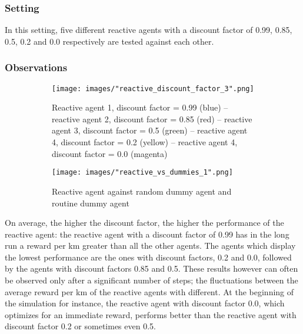 \documentclass[11pt]{article}
\begin{document}
\subsubsection{Setting}
In this setting, five different reactive agents with a discount factor of 0.99, 0.85, 0.5, 0.2 and 0.0 respectively are tested against each other.

\subsubsection{Observations}

\begin{figure}[h!]
\centering
\begin{subfigure}[t]{0.47\textwidth}
\captionsetup{width=1.0\textwidth}
\texttt{[image: images/"reactive\_discount\_factor\_3".png]}
\caption{Reactive agent 1, discount factor = 0.99 (blue) -- reactive agent 2, discount factor = 0.85 (red) -- reactive agent 3, discount factor = 0.5 (green) -- reactive agent 4, discount factor = 0.2 (yellow) -- reactive agent 4, discount factor = 0.0 (magenta)}
\end{subfigure}
\hfill
\begin{subfigure}[t]{0.47\textwidth}
\captionsetup{width=1.0\textwidth}
\texttt{[image: images/"reactive\_vs\_dummies\_1".png]}
\caption{Reactive agent against random dummy agent and routine dummy agent}
\end{subfigure}
\caption{}
\end{figure}

On average, the higher the discount factor, the higher the performance of the reactive agent: the reactive agent with a discount factor of 0.99 has in the long run a reward per km greater than all the other agents.
The agents which display the lowest performance are the ones with discount factors, 0.2 and 0.0, followed by the agents with discount factors 0.85 and 0.5. 
These results however can often be observed only after a significant number of steps; the fluctuations between the average reward per km of the reactive agents with different.
At the beginning of the simulation for instance, the reactive agent with discount factor 0.0, which optimizes for an immediate reward, performs better than the reactive agent with discount factor 0.2 or sometimes even 0.5.
\end{document}
